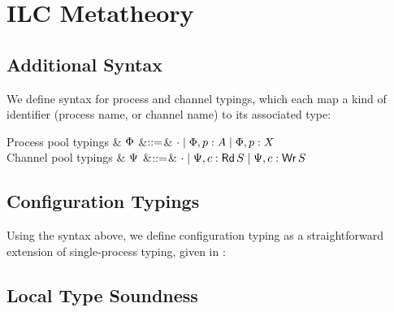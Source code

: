 \section{ILC Metatheory}
\label{sec:ilcproofs}

\subsection{Additional Syntax}

We define syntax for process and channel typings, which each map a kind of
identifier (process name, or channel name) to its associated type:

\begin{grammar}
    Process pool typings
    & $\Phi$
    &$\mathrel{::=}$& $\cdot \mathrel{\mid} \Phi,p:A \mathrel{\mid} \Phi,p:X$
    \\
    Channel pool typings
    & $\Psi$
    &$\mathrel{::=}$& $\cdot \mathrel{\mid} \Psi,c:\textnormal{\textsf{Rd}}\,S \mathrel{\mid} \Psi,c:\textnormal{\textsf{Wr}}\,S$
\end{grammar}

\subsection{Configuration Typings}

Using the syntax above, we define configuration typing as a straightforward extension
of single-process typing, given in :\smallskip



\subsection{Local Type Soundness}

